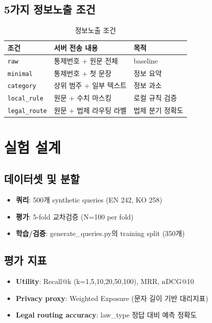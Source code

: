 \documentclass[11pt,a4paper]{article}
\begin{document}
\subsection{5가지 정보노출 조건}

\begin{table}[h]
\centering
\caption{정보노출 조건}
\begin{tabular}{lll}
\toprule
조건 & 서버 전송 내용 & 목적 \\
\midrule
\texttt{raw} & 통제번호 + 원문 전체 & baseline \\
\texttt{minimal} & 통제번호 + 첫 문장 & 정보 요약 \\
\texttt{category} & 상위 범주 + 일부 텍스트 & 정보 과소 \\
\texttt{local\_rule} & 원문 + 수치 마스킹 & 로컬 규칙 검증 \\
\texttt{legal\_route} & 원문 + 법제 라우팅 라벨 & 법제 분기 정확도 \\
\bottomrule
\end{tabular}
\end{table}

\section{실험 설계}
\label{sec:experiment}

\subsection{데이터셋 및 분할}
\begin{itemize}
\item \textbf{쿼리}: 500개 synthetic queries (EN 242, KO 258)
\item \textbf{평가}: 5-fold 교차검증 (N=100 per fold)
\item \textbf{학습/검증}: generate\_queries.py의 training split (350개)
\end{itemize}

\subsection{평가 지표}
\begin{itemize}
\item \textbf{Utility}: Recall@k (k=1,5,10,20,50,100), MRR, nDCG@10
\item \textbf{Privacy proxy}: Weighted Exposure (문자 길이 기반 대리지표)
\item \textbf{Legal routing accuracy}: law\_type 정답 대비 예측 정확도
\end{itemize}
\end{document}
